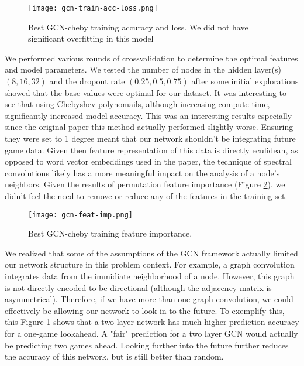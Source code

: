 \documentclass{article}
\begin{document}
\begin{figure}[h!]
    \centering
    \texttt{[image: gcn-train-acc-loss.png]}
    \caption{Best GCN-cheby training accuracy and loss. We did not have significant overfitting in this model}
    \label{fig:lookahead}
\end{figure}

We performed various rounds of crossvalidation to determine the optimal features and model parameters. 
We tested the number of nodes in the hidden layer(s) $(8,16,32)$ and the dropout rate $(0.25,0.5,0.75)$ after some initial explorations showed that the base values were optimal for our dataset. 
It was interesting to see that using Chebyshev polynomails, although increasing compute time, significantly increased model accuracy.
This was an interesting results especially since the original paper this method actually performed slightly worse. 
Ensuring they were set to 1 degree meant that our network shouldn't be integrating future game data.
Given then feature representation of this data is directly eculidean, as opposed to word vector embeddings used in the paper, the technique of spectral convolutions likely has a more meaningful impact on the analysis of a node's neighbors.
Given the results of permutation feature importance (Figure \ref{fig:feat-imp}), we didn't feel the need to remove or reduce any of the features in the training set.

\begin{figure}[h!]
    \centering
    \texttt{[image: gcn-feat-imp.png]}
    \caption{Best GCN-cheby training feature importance.}
    \label{fig:feat-imp}
\end{figure}

We realized that some of the assumptions of the GCN framework actually limited our network structure in this problem context. 
For example, a graph convolution integrates data from the immidiate neighborhood of a node. 
However, this graph is not directly encoded to be directional (although the adjacency matrix is asymmetrical).
Therefore, if we have more than one graph convolution, we could effectively be allowing our network to look in to the future. 
To exemplify this, this Figure \ref{fig:lookahead} shows that a two layer network has much higher prediction accuracy for a one-game lookahead. 
A "fair" prediction for a two layer GCN would actually be predicting two games ahead.
Looking further into the future further reduces the accuracy of this network, but is still better than random.
\end{document}
